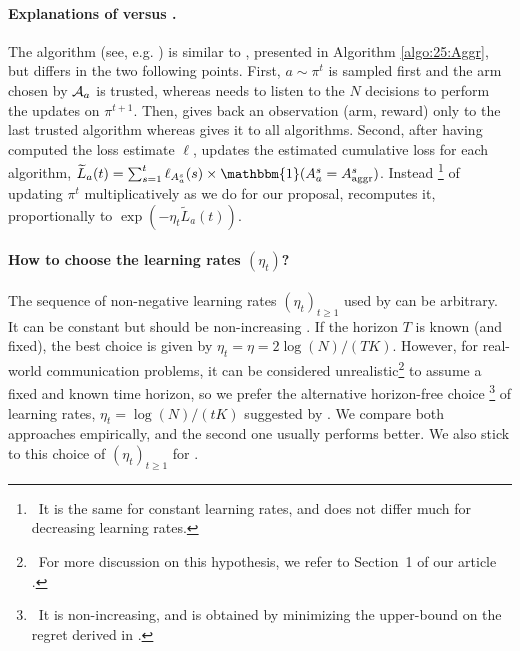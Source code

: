\paragraph{Explanations of \Aggr{} versus \ExpQ{} .}\label{sub:25:Exp4}

The \ExpQ{} algorithm (see, e.g. \cite[Section 4.2]{Bubeck12})
is similar to \Aggr{}, presented in Algorithm \ref{algo:25:Aggr},
but differs in the two following points.
%
First, $a\sim\pi^t$ is sampled first and the arm chosen by $\mathcal{A}_a$ is trusted, whereas \Aggr{}
needs to listen to the $N$ decisions to perform the updates on $\pi^{t+1}$.
Then, \ExpQ{} gives back an observation (arm, reward) only to the last trusted algorithm
whereas \Aggr{} gives it to all algorithms.
%
Second, after having computed the loss estimate $\ell$, \ExpQ{} updates the estimated cumulative loss for each algorithm,
$\widetilde{L}_a(t) = \sum_{s=1}^{t} \ell_{A_a^s}(s) \times \mathbbm{1}(A^{s}_{a} = A^{s}_{\mathrm{aggr}})$.
%
Instead
\footnote{~It is the same for constant learning rates, and does not differ much for decreasing learning rates.}
of updating $\pi^{t}$ multiplicatively as we do for our proposal, \ExpQ{} recomputes it, proportionally to
$\exp(- \eta_t \widetilde{L}_a(t))$.


\paragraph{How to choose the learning rates $(\eta_t)$?}
%
The sequence of non-negative learning rates $(\eta_t)_{t \geq 1}$ used by \ExpQ{} can be arbitrary.
It can be constant but should be non-increasing \cite[Theorem 4.2]{Bubeck12}.
If the horizon $T$ is known (and fixed), the best choice is given by $\eta_t = \eta = 2 \log(N) / (T K)$.
However, for real-world communication problems, it can be considered unrealistic\footnote{~For more discussion on this hypothesis, we refer to Section~1 of our article \cite{Besson2018DoublingTricks}.} to assume a fixed and known time horizon, so we prefer the alternative horizon-free choice%
\footnote{~It is non-increasing, and is obtained by minimizing the upper-bound on the regret derived in \cite[pp48]{Bubeck12}.}
of learning rates,
$\eta_t = \log(N) / (t K)$ suggested by \cite{Bubeck12}.
We compare both approaches empirically, and the second one usually performs better.
We also stick to this choice of $(\eta_t)_{t \geq 1}$ for \Aggr.



